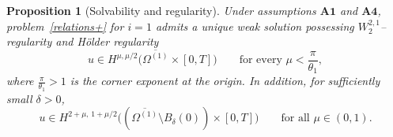 \documentclass[reqno]{amsart}            %
\newtheorem{proposition}{Proposition}[section]
\numberwithin{equation}{section}
\begin{document}
	
	\begin{proposition}[Solvability and regularity]\label{prop-2-1}
		Under assumptions $\mathbf{A1}$ and $\mathbf{A4}$, 
		problem~\eqref{relations+} for $i=1$ admits a unique weak solution 
		possessing $W^{2,1}_2$--regularity and Hölder regularity
		\begin{equation}\label{hoelder-0}
			u\in H^{\mu,\mu/2}\big(\overline{\Omega^{(1)}}\times[0,T]\big)
			\qquad\text{for every }\mu< \frac{\pi}{\theta_1},
		\end{equation}
		where $\frac{\pi}{\theta_1}>1$ is the corner exponent at the origin.
		In addition, for  sufficiently small $\delta>0$,
		\begin{equation}\label{hoelder}
			u\in H^{2+\mu,\,1+\mu/2}\big((\overline{\Omega^{(1)}}\setminus B_\delta(0))\times[0,T]\big)
			\qquad\text{for all }\mu\in(0,1).
		\end{equation}
	\end{proposition}
\end{document}
